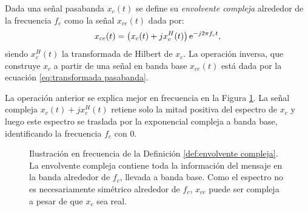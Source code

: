 \begin{definicion}\label{def:envolvente compleja}
    Dada una señal pasabanda $x_c(t)$ se define su \emph{envolvente compleja} alrededor de la frecuencia $f_c$ como la señal $x_{ce}(t)$ dada por:
    \begin{equation}\label{eq:envolvente compleja}
        x_{ce}(t) = \left(x_c(t) + j x_c^{H}(t) \right)\mathrm{e}^{-j2\pi f_c t},
    \end{equation}
    siendo $x_c^{H}(t)$ la transformada de Hilbert de $x_c$. La operación inversa, que construye $x_c$ a partir de una señal en banda base $x_{ce}(t)$ está dada por la ecuación \eqref{eq:transformada pasabanda}.
\end{definicion}

La operación anterior se explica mejor en frecuencia en la Figura \ref{fig:envolvente compleja}. La señal compleja $x_c(t)+jx_c^{H}(t)$ retiene solo la mitad positiva del espectro de $x_c$ y luego este espectro se traslada por la exponencial compleja a banda base, identificando la frecuencia $f_c$ con $0$.


\begin{figure}
    \begin{center}
        \hspace{1cm}
    \end{center}
    \caption{Ilustración en frecuencia de la Definición \ref{def:envolvente compleja}. La envolvente compleja contiene toda la información del mensaje en la banda alrededor de $f_c$, llevada a banda base. Como el espectro no es necesariamente simétrico alrededor de $f_c$, $x_{ce}$ puede ser compleja a pesar de que $x_c$ sea real.}\label{fig:envolvente compleja}
\end{figure}

